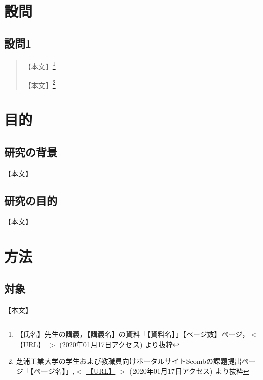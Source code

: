 \documentclass[a4paper, papersize]{jsarticle}
\begin{document}
\begin{multicols}{2}

  \section{設問}


  \subsection{設問1}
  \begin{quotation}
    【本文】\footnote{【氏名】先生の講義，【講義名】の資料「【資料名】」【ページ数】ページ，$<$ \url{【URL】} $>$ (2020年01月17日アクセス) より抜粋}

    【本文】\footnote{芝浦工業大学の学生および教職員向けポータルサイトScombの課題提出ページ「【ページ名】」,$<$ \url{【URL】} $>$ (2020年01月17日アクセス) より抜粋}
  \end{quotation}


  \section{目的}


  \subsection{研究の背景}
  【本文】


  \subsection{研究の目的}
  【本文】


  \section{方法}


  \subsection{対象}
  【本文】


\end{multicols}
\end{document}
